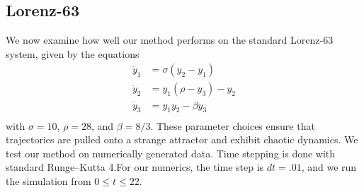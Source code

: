 \documentclass[a4paper,11pt]{article}
\begin{document}
\subsection{Lorenz-63}
We now examine how well our method performs on the standard Lorenz-63 system, given by the equations
\begin{align*}
\dot{y}_{1} & = \sigma(y_{2}-y_{1})\\
\dot{y}_{2} & = y_{1}(\rho - y_{3}) - y_{2}\\
\dot{y}_{3} & = y_{1}y_{2}-\beta y_{3}\\
\end{align*}
with $\sigma=10$, $\rho=28$, and $\beta = 8/3$.  These parameter choices ensure that trajectories are pulled onto a strange attractor and exhibit chaotic dynamics.  We test our method on numerically generated data.  Time stepping is done with standard Runge--Kutta 4.For our numerics, the time step is $dt=.01$, and we run the simulation from $0\leq t \leq 22$.  
\end{document}
